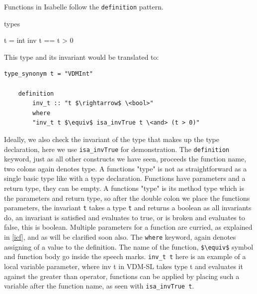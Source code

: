 	Functions in Isabelle follow the \lstinline[language=Isabelle, mathescape]{definition} pattern.
	\begin{vdmsl}
	types

	t = int
	inv t == t > 0
	\end{vdmsl}
	This type and its invariant would be translated to:
	\begin{lstlisting}[language=Isabelle, mathescape]
	type_synonym t = "VDMInt"

	definition
		inv_t :: "t $\rightarrow$ \<bool>"
	    where
	    "inv_t t $\equiv$ isa_invTrue t \<and> (t > 0)"
	\end{lstlisting}

	Ideally, we also check the invariant of the type that makes up the type declaration, here we use  \lstinline[language=Isabelle, mathescape]{isa_invTrue} for demonstration. The  \lstinline[language=Isabelle, mathescape]{definition} keyword, just as all other constructs we have seen, proceeds the function name, two colons again denotes type. A functions "type" is not as straightforward as a single basic type like with a type declaration. Functions have parameters and a return type, they can be empty. A functions "type" is its method type which is the parameters and return type, so after the double colon we place the functions parameters, the invariant  \lstinline[language=Isabelle, mathescape]{t} takes a type  \lstinline[language=Isabelle, mathescape]{t} and returns a boolean as all invariants do, an invariant is satisfied and evaluates to true, or is broken and evaluates to false, this is boolean. Multiple parameters for a function are curried, as explained in \ref{icf}, and as will be clarified soon also. The  \lstinline[language=Isabelle, mathescape]{where} keyword, again denotes assigning of a value to the definition. The name of the function,  \lstinline[language=Isabelle, mathescape]{$\equiv$} symbol and function body go inside the speech marks.  \lstinline[language=Isabelle, mathescape]{inv_t t} here is an example of a local variable parameter, where inv t in VDM-SL takes type t and evaluates it against the greater than operator, functions can be applied by placing such a variable after the function name, as seen with  \lstinline[language=Isabelle, mathescape]{isa_invTrue t}.

